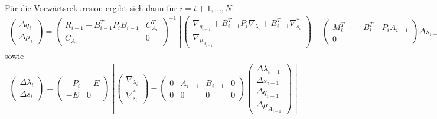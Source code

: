 \documentclass[12pt,a4paper]{article}
\begin{document}
  Für die Vorwärtsrekurrsion ergibt sich dann für $ i = t+1,...,N$:
  \begin{align*}
  \begin{pmatrix}
  \Delta q_i \\
  \Delta \mu_i
  \end{pmatrix} =
  \begin{pmatrix}
R_{i-1}+B_{i-1}^{T}P_i B_{i-1} & C_{A_i}^T \\
C_{A_i} & 0
\end{pmatrix} ^{-1}
  \left[ 
  \begin{pmatrix}
\nabla_{q_{i-1}} +B_{i-1}^{T}P_i \nabla_{\lambda_{i}} +B_{i-1}^{T}\nabla_{s_{i}}^{*} \\
\nabla_{\mu_{A_{i-1}}}
\end{pmatrix}
  -
  \begin{pmatrix}
  M_{i-1}^T + B_{i-1}^{T}P_i A_{i-1} \\
  0
  \end{pmatrix} \Delta s_{i-1} \right] 
  \end{align*}
  sowie
  \begin{align*}
  \begin{pmatrix}
  \Delta \lambda_{i} \\
  \Delta s_{i}
  \end{pmatrix} =
  \begin{pmatrix}
  -P_i & -E \\
  -E  & 0 
  \end{pmatrix} \left[ 
  \begin{pmatrix}
  \nabla_{\lambda_{i}} \\
  \nabla_{s_{i}}^{*}
  \end{pmatrix} -
  \begin{pmatrix}
  0 & A_{i-1} & B_{i-1} & 0 \\
  0 & 0 & 0 & 0 
  \end{pmatrix}
  \begin{pmatrix}
  \Delta \lambda_{i-1} \\
  \Delta s_{i-1} \\
  \Delta q_{i-1} \\
  \Delta \mu_{A_{i-1}}
  \end{pmatrix} \right] 
  \end{align*}
\end{document}
